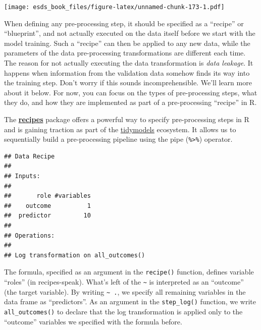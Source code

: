 \documentclass[
]{book}
\newenvironment{Shaded}{\begin{snugshade}}{\end{snugshade}}
\newcommand{\CommentTok}[1]{\textcolor[rgb]{0.56,0.35,0.01}{\textit{#1}}}
\newcommand{\DataTypeTok}[1]{\textcolor[rgb]{0.13,0.29,0.53}{#1}}
\newcommand{\KeywordTok}[1]{\textcolor[rgb]{0.13,0.29,0.53}{\textbf{#1}}}
\newcommand{\NormalTok}[1]{#1}
\newcommand{\OperatorTok}[1]{\textcolor[rgb]{0.81,0.36,0.00}{\textbf{#1}}}
\newcommand{\StringTok}[1]{\textcolor[rgb]{0.31,0.60,0.02}{#1}}
\begin{document}
\texttt{[image: esds\_book\_files/figure-latex/unnamed-chunk-173-1.pdf]}

When defining any pre-processing step, it should be specified as a ``recipe'' or ``blueprint'', and not actually executed on the data itself before we start with the model training. Such a ``recipe'' can then be applied to any new data, while the parameters of the data pre-processing transformations are different each time. The reason for not actually executing the data transformation is \emph{data leakage}. It happens when information from the validation data somehow finds its way into the training step. Don't worry if this sounds incomprehensible. We'll learn more about it below. For now, you can focus on the types of pre-processing steps, what they do, and how they are implemented as part of a pre-processing ``recipe'' in R.

The \href{https://recipes.tidymodels.org/}{\textbf{recipes}} package offers a powerful way to specify pre-processing steps in R and is gaining traction as part of the \href{https://www.tidymodels.org/}{tidymodels} ecosystem. It allows us to sequentially build a pre-processing pipeline using the pipe (\texttt{\%\textgreater{}\%}) operator.

\begin{Shaded}
\end{Shaded}

\begin{verbatim}
## Data Recipe
## 
## Inputs:
## 
##       role #variables
##    outcome          1
##  predictor         10
## 
## Operations:
## 
## Log transformation on all_outcomes()
\end{verbatim}

The formula, specified as an argument in the \texttt{recipe()} function, defines variable ``roles'' (in recipes-speak). What's left of the \texttt{\textasciitilde{}} is interpreted as an ``outcome'' (the target variable). By writing \texttt{\textasciitilde{}\ .}, we specify all remaining variables in the data frame as ``predictors''. As an argument in the \texttt{step\_log()} function, we write \texttt{all\_outcomes()} to declare that the log transformation is applied only to the ``outcome'' variables we specified with the formula before.
\end{document}
